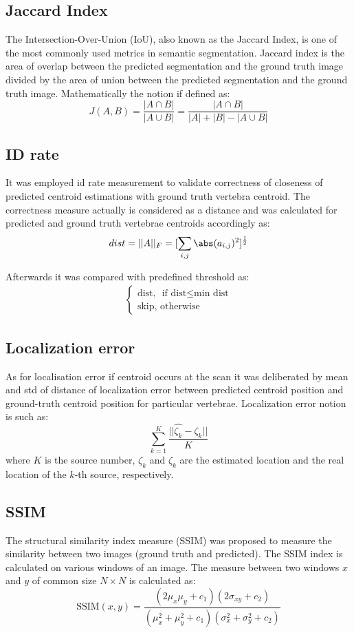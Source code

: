 \subsection{Jaccard Index}
The Intersection-Over-Union (IoU), also known as the Jaccard Index, is one of the most commonly used metrics in semantic segmentation. Jaccard index is the area of overlap between the predicted segmentation and the ground truth image divided by the area of union between the predicted segmentation and the ground truth image. Mathematically the notion if defined as: 
\[ J(A,B) = \frac{|A \cap B|}{|A \cup B|} = \frac{|A \cap B|}{|A| + |B| - |A \cup B|}\]

\subsection{ID rate}
It was employed id rate measurement to validate correctness of closeness of predicted centroid estimations with ground truth vertebra centroid. The correctness measure actually is considered as a distance and was calculated for predicted and ground truth vertebrae centroids accordingly as:
\[ dist = ||A||_F = [\sum_{i,j} \abs(a_{i,j})^2]^{\frac{1}{2}} \]

Afterwards it was compared with predefined threshold as:
\begin{align*}
\begin{cases}
\text{dist, } \mbox{ if } \text{dist} \leq \text{min dist} \\ 
\text{skip}, \mbox{ otherwise} \end{cases}
\end{align*}

\subsection{Localization error}
As for localisation error if centroid occurs at the scan it was deliberated by mean and std of distance of localization error between predicted centroid position and ground-truth centroid position for particular vertebrae. Localization error notion is such as:
\[ \sum_{k=1}^K \frac{||\hat{\zeta_k} - \zeta_k || }{K} \]
where $K$ is the source number, $\hat{\zeta_k}$ and $\zeta_k$ are the estimated location and the real location of the $k$-th source, respectively.

\subsection{SSIM}
The structural similarity index measure (SSIM) was proposed to measure the similarity between two images (ground truth and predicted). The SSIM index is calculated on various windows of an image. The measure between two windows  $x$ and $y$ of common size $N \times N$ is calculated as: 
\[ \text{SSIM}(x,y) = \frac{(2\mu_x\mu_y + c_1)(2\sigma_{xy}+c_2)}{(\mu_x^2+\mu_y^2+c_1)(\sigma_x^2+\sigma_y^2+c_2)}\]

